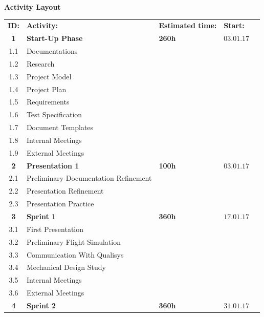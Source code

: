 \begin{center}
\textbf{\Large Activity Layout} \\
\begin{tabular}{cllll}
\rowcolor{cadetgrey}
\textbf{ID:}    &\textbf{Activity:} 	 &\textbf{Estimated time:}    &\textbf{Start:}  \\ %
    
\textbf{1} & \textbf{Start-Up Phase} & \textbf{260h} & $03.01.17$ 
\\\rowcolor{gainsboro}
1.1       & Documentations     &     &  \\
1.2       & Research     &     &  \\\rowcolor{gainsboro}
1.3       & Project Model     &     & \\
1.4       & Project Plan     &     & 
\\\rowcolor{gainsboro}
1.5       & Requirements     &     & \\
1.6       & Test Specification     &     & 
\\\rowcolor{gainsboro}
1.7       & Document Templates     &    & \\
1.8       & Internal Meetings      &    & 
\\\rowcolor{gainsboro}
1.9       & External Meetings      &    & \\
\textbf{2} & \textbf{Presentation 1}     & \textbf{100h}    & $03.01.17$ 
\\\rowcolor{gainsboro}
2.1     & Preliminary Documentation Refinement  &    & \\
2.2     & Presentation Refinement  &    &
\\\rowcolor{gainsboro}
2.3     & Presentation Practice  &    & \\
\textbf{3} & \textbf{Sprint 1}     & \textbf{360h}     & $17.01.17$ 
\\\rowcolor{gainsboro}
3.1     & First Presentation &  & \\
3.2     & Preliminary Flight Simulation &  & 
\\\rowcolor{gainsboro}
3.3     & Communication With Qualisys &  & \\
3.4     & Mechanical Design Study &  & 
\\\rowcolor{gainsboro}
3.5       & Internal Meetings      &    & \\
3.6       & External Meetings      &    & 
\\\rowcolor{gainsboro}
\textbf{4} & \textbf{Sprint 2}     & \textbf{360h}     & $31.01.17$ \\

\end{tabular}
\end{center}
